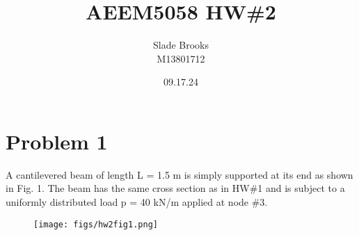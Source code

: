 \documentclass[12 pt]{article}
\title{AEEM5058 HW\#2}
\date{09.17.24}
\author{Slade Brooks \\ M13801712}
\begin{document}
\maketitle

\section*{Problem 1}
A cantilevered beam of length L = 1.5 m is simply supported at its end as shown in Fig. 1. The
beam has the same cross section as in HW\#1 and is subject to a uniformly distributed load p = 40
kN/m applied at node \#3.
\begin{figure}[!hbtp]
    \centering
    \texttt{[image: figs/hw2fig1.png]}
\end{figure} \par

\pagebreak
\end{document}
